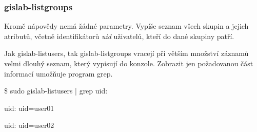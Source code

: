 \subsubsection{gislab-listgroups}
Kromě nápovědy nemá žádné parametry. Vypíše seznam všech skupin a
jejich atributů, včetně identifikátorů \textit{uid} uživatelů, kteří
do dané skupiny patří.

Jak \textsf{gislab-listusers}, tak \textsf{gislab-listgroups} vracejí
při větším množství záznamů velmi dlouhý seznam, který vypisují do
konzole. Zobrazit jen požadovanou část informací umožňuje program
grep.

\textsf{\$ sudo gislab-listusers | grep uid:}

\textsf{uid: uid=user01}

\textsf{uid: uid=user02}


